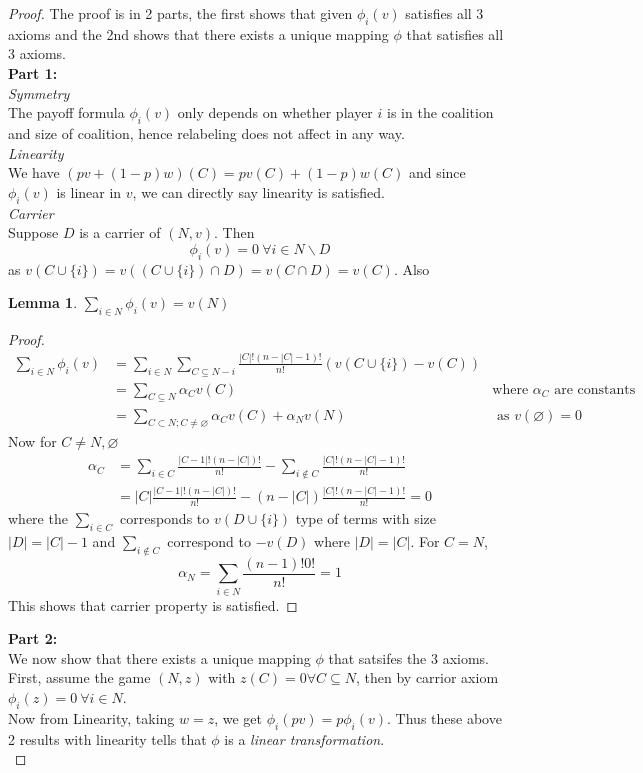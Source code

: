 \documentclass{article}
\theoremstyle{definition}
\newtheorem{lem}{Lemma}[section]
\begin{document}
\begin{proof}
The proof is in 2 parts, the first shows that given $\phi_i(v)$ satisfies all 3 axioms and the 2nd shows that there exists a unique mapping $\phi$ that satisfies all 3 axioms.\\

\textbf{Part 1:}\\
\indent\textit{Symmetry}\\
The payoff formula $\phi_i(v)$ only depends on whether player $i$ is in the coalition and size of coalition, hence relabeling does not affect in any way.\\

\textit{Linearity}\\
We have $(pv + (1-p)w)(C) = pv(C) + (1-p)w(C)$ and since $\phi_i(v)$ is linear in $v$, we can directly say linearity is satisfied.\\

\textit{Carrier}\\
Suppose $D$ is a carrier of $(N,v)$. Then $$\phi_i(v) = 0 ~\forall i \in N\backslash D$$ as $v(C \cup \{i\}) = v((C \cup \{i\})\cap D) = v(C\cap D) = v(C)$. Also
\begin{lem}
$\sum_{i \in N} \phi_i(v) = v(N)$
\end{lem}
\begin{proof}
\begin{align*}
\sum_{i \in N}\phi_i(v) &= \sum_{i \in N}\sum_{C\subseteq N-i} \frac{|C|!(n-|C|-1)!}{n!}(v(C\cup \{i\}) - v(C))\\
&= \sum_{C \subseteq N} \alpha_Cv(C)&\text{where } \alpha_C \text{ are constants}\\
&= \sum_{C \subset N; C\neq \varnothing} \alpha_Cv(C) + \alpha_Nv(N) &\text{ as } v(\varnothing) = 0
\end{align*}
Now for $C \neq N, \varnothing$
\begin{align*}
\alpha_C &= \sum_{i \in C} \frac{|C-1|!(n-|C|)!}{n!} - \sum_{i \notin C} \frac{|C|!(n-|C|-1)!}{n!}\\
&= |C|\frac{|C-1|!(n-|C|)!}{n!} - (n-|C|)\frac{|C|!(n-|C|-1)!}{n!} = 0 
\end{align*}
where the $\sum_{i \in C}$ corresponds to $v(D\cup \{i\})$ type of terms with size $|D| = |C| - 1$ and $\sum_{i \notin C}$ correspond to $-v(D)$ where $|D| = |C|$. For $C = N$, $$\alpha_N = \sum_{i \in N} \frac{(n-1)!0!}{n!} = 1$$
This shows that carrier property is satisfied.
\end{proof}
\textbf{Part 2:}\\
We now show that there exists a unique mapping $\phi$ that satsifes the 3 axioms.\\
First, assume the game $(N,z)$ with $z(C) = 0\forall C\subseteq N$, then by carrior axiom $\phi_i(z) = 0~\forall i \in N$.\\
Now from Linearity, taking $w = z$, we get $\phi_i(pv) = p\phi_i(v)$. Thus these above 2 results with linearity tells that $\phi$ is a \textit{linear transformation}.\\


\end{proof}
\end{document}
